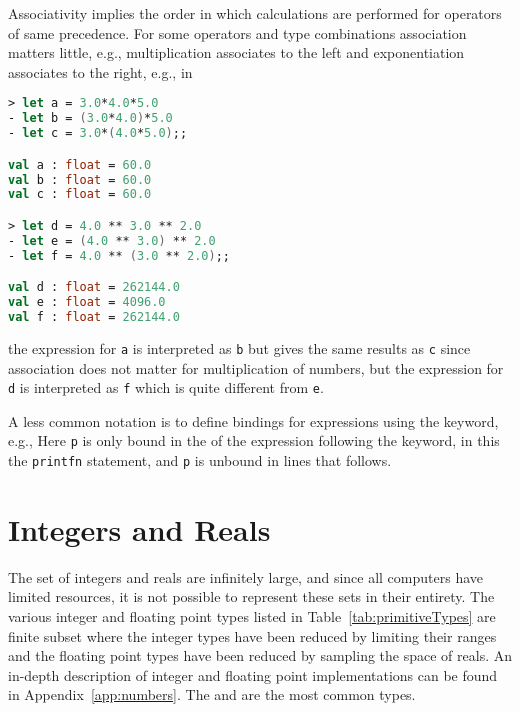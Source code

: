 Associativity implies the order in which calculations are performed for operators of same precedence. For some operators and type combinations association matters little, e.g., multiplication associates to the left and exponentiation associates to the right, e.g., in
\begin{lstlisting}[language=fsharp,caption={fsharpi}]
> let a = 3.0*4.0*5.0
- let b = (3.0*4.0)*5.0
- let c = 3.0*(4.0*5.0);;

val a : float = 60.0
val b : float = 60.0
val c : float = 60.0

> let d = 4.0 ** 3.0 ** 2.0
- let e = (4.0 ** 3.0) ** 2.0
- let f = 4.0 ** (3.0 ** 2.0);;

val d : float = 262144.0
val e : float = 4096.0
val f : float = 262144.0
\end{lstlisting}
the expression for \lstinline|a| is interpreted as \lstinline|b| but gives the same results as \lstinline|c| since association does not matter for multiplication of numbers, but the expression for \lstinline|d| is interpreted as \lstinline|f| which is quite different from \lstinline|e|.

A less common notation is to define bindings for expressions using the  keyword, e.g.,
%
%
Here \lstinline|p| is only bound in the  of the expression following the  keyword, in this the \lstinline|printfn| statement, and \lstinline|p| is unbound in lines that follows.
\begin{comment}
  Here the use of indentation to define a sequence of expressions
  \fs{numbersInWIndentation}{The name \lstinline!p! is only bound in the nested scope following the keyword \keyword{in}.}
\end{comment}

\section{Integers and Reals}
The set of integers and reals are infinitely large, and since all computers have limited resources, it is not possible to represent these sets in their entirety. The various integer and floating point types listed in Table~\ref{tab:primitiveTypes} are finite subset where the integer types have been reduced by limiting their ranges and the floating point types have been reduced by sampling the space of reals. An in-depth description of integer and floating point implementations can be found in Appendix~\ref{app:numbers}. The  and  are the most common types. 

